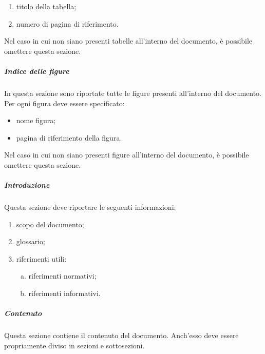 \documentclass[../NormeProgetto.tex]{subfiles}
\begin{document}
		\begin{enumerate}
			\item titolo della tabella;
			\item numero di pagina di riferimento.
		\end{enumerate}

		Nel caso in cui non siano presenti tabelle all'interno del documento, è possibile omettere questa sezione.

		\subparagraph{Indice delle figure}
		In questa sezione sono riportate tutte le figure presenti all'interno del documento. Per ogni figura deve essere specificato:
		\begin{itemize}
			\item nome figura;
			\item pagina di riferimento della figura.
		\end{itemize}
		Nel caso in cui non siano presenti figure all'interno del documento, è possibile omettere questa sezione.

		\subparagraph{Introduzione}
		Questa sezione deve riportare le seguenti informazioni:
		\begin{enumerate}
			\item scopo del documento;
			\item glossario;
			\item riferimenti utili:
			\begin{enumerate}[a.]
				\item riferimenti normativi;
				\item riferimenti informativi.
			\end{enumerate}
		\end{enumerate}

		\subparagraph{Contenuto}
		Questa sezione contiene il contenuto del documento. Anch'esso deve essere propriamente diviso in sezioni e sottosezioni.
	
\end{document}

